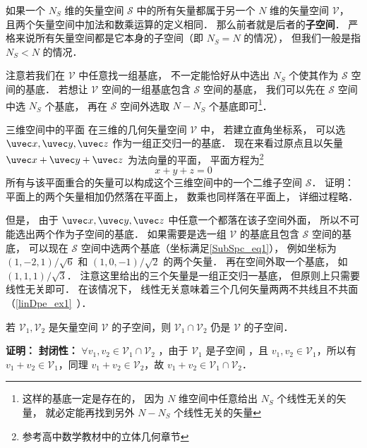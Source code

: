 

如果一个 $N_S$ 维的矢量空间 $\mathcal S$ 中的所有矢量都属于另一个 $N$ 维的矢量空间 $\mathcal V$， 且两个矢量空间中加法和数乘运算的定义相同． 那么前者就是后者的\textbf{子空间}． 严格来说所有矢量空间都是它本身的子空间（即 $N_S = N$ 的情况）， 但我们一般是指 $N_S < N$ 的情况．

注意若我们在 $\mathcal V$ 中任意找一组基底， 不一定能恰好从中选出 $N_S$ 个使其作为 $\mathcal S$ 空间的基底． 若想让 $\mathcal V$ 空间的一组基底包含 $\mathcal S$ 空间的基底， 我们可以先在 $\mathcal S$ 空间中选 $N_S$ 个基底， 再在 $\mathcal S$ 空间外选取 $N - N_S$ 个基底即可\footnote{这样的基底一定是存在的， 因为 $N$ 维空间中任意给出 $N_S$ 个线性无关的矢量， 就必定能再找到另外 $N - N_S$ 个线性无关的矢量}．

\begin{example}{三维空间中的平面}
在三维的几何矢量空间 $\mathcal V$ 中， 若建立直角坐标系， 可以选 $\uvec x, \uvec y, \uvec z$ 作为一组正交归一的基底． 现在来看过原点且以矢量 $\uvec x + \uvec y + \uvec z$ 为法向量的平面， 平面方程为\footnote{参考高中数学教材中的立体几何章节}
\begin{equation}\label{SubSpc_eq1}
x + y + z = 0
\end{equation}
所有与该平面重合的矢量可以构成这个三维空间中的一个二维子空间 $\mathcal S$． 证明： 平面上的两个矢量相加仍然落在平面上， 数乘也同样落在平面上， 详细过程略． 

但是， 由于 $\uvec x, \uvec y, \uvec z$ 中任意一个都落在该子空间外面， 所以不可能选出两个作为子空间的基底． 如果需要是选一组 $\mathcal V$ 的基底且包含 $\mathcal S$ 空间的基底， 可以现在 $\mathcal S$ 空间中选两个基底（坐标满足\autoref{SubSpc_eq1}）， 例如坐标为 $(1, -2, 1)/\sqrt{6}$ 和 $(1, 0, -1)/\sqrt{2}$ 的两个矢量． 再在空间外取一个基底， 如 $(1, 1, 1)/\sqrt{3}$． 注意这里给出的三个矢量是一组正交归一基底， 但原则上只需要线性无关即可． 在该情况下， 线性无关意味着三个几何矢量两两不共线且不共面（\autoref{linDpe_ex1}~）．
\end{example}
\begin{theorem}{}
若 $\mathcal V_1,\mathcal V_2$ 是矢量空间 $\mathcal V$ 的子空间，则 $\mathcal V_1\cap\mathcal V_2$ 仍是 $\mathcal V$ 的子空间．
\end{theorem}
\textbf{证明：} \textbf{封闭性：} $\forall v_1,v_2\in\mathcal V_1\cap\mathcal V_2$ ，由于 $\mathcal V_1$ 是子空间 ，且 $v_1,v_2\in\mathcal V_1$，所以有 $v_1+v_2\in \mathcal V_1$，同理 $v_1+v_2\in \mathcal V_2$，故 $v_1+v_2\in \mathcal V_1\cap\mathcal V_2$．


